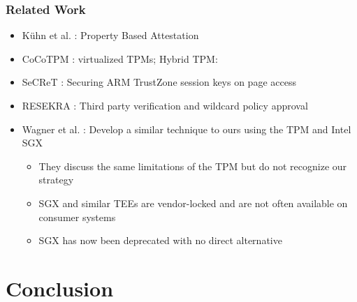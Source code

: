 \documentclass[
  notes,
]{beamer}
\begin{document}
\begin{frame}
  \frametitle{Related Work}

  \begin{itemize}
    \item K\"uhn et al. \cite{Kuhn:Realizing-Property-Based-Attestation:2007}: Property Based Attestation
    \item CoCoTPM \cite{Pecholt:CoCoTPM-Secure-vTPM:2022}: virtualized TPMs; Hybrid TPM: \cite{Kim:hTPM-Hybrid-TPM:2019}
    \item SeCReT \cite{Jang:SeCReT:2015}: Securing ARM TrustZone session keys on page access
    \item RESEKRA \cite{Gomez:RESEKRA:2022}: Third party verification and wildcard policy approval
    \item Wagner et al. \cite{Wagner:Distributed-Usage-Control-SGX:2018}: Develop a similar technique to ours using the TPM and Intel SGX
    \begin{itemize}
      \item They discuss the same limitations of the TPM but do not recognize our strategy
      \item SGX and similar TEEs are vendor-locked and are not often available on consumer systems
      \item SGX has now been deprecated with no direct alternative
    \end{itemize}
  \end{itemize}
\end{frame}
\begin{NoHyper}
\end{NoHyper}

\section{Conclusion}
\end{document}
